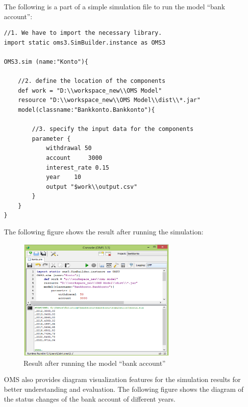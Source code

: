 \par
The following is a part of a simple simulation file to run the model “bank account”:
\begin{lstlisting}
//1. We have to import the necessary library.
import static oms3.SimBuilder.instance as OMS3

OMS3.sim (name:"Konto"){

	//2. define the location of the components
	def work = "D:\\workspace_new\\OMS Model"
	resource "D:\\workspace_new\\OMS Model\\dist\\*.jar"
	model(classname:"Bankkonto.Bankkonto"){

		//3. specify the input data for the components
		parameter {
			withdrawal 50
			account 	3000
			interest_rate 0.15
			year 	10
			output "$work\\output.csv"
		}
	}
}
\end{lstlisting}
\par
The following figure shows the result after running the simulation:
\begin{figure}[h]
	\centering
	\includegraphics[width=0.7\textwidth]{pics/oms/Figure9.png}
	\caption{Result after running the model “bank account”
 \label{fig:Result_Bank_Account}}	
\end{figure}
\par
OMS also provides diagram visualization features for the simulation results for better understanding and evaluation. The following figure shows the diagram of the status changes of the bank account of different years.
